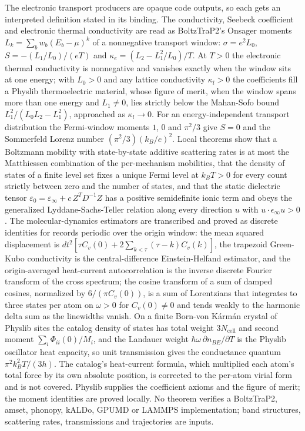\documentclass[11pt,a4paper]{article}
\begin{document}
The electronic transport producers are opaque code outputs, so each gets an interpreted definition stated in its binding. The conductivity, Seebeck coefficient and electronic thermal conductivity are read as BoltzTraP2's Onsager moments $L_k = \sum_b w_b (E_b - \mu)^k$ of a nonnegative transport window: $\sigma = e^2 L_0$, $S = -(L_1/L_0)/(eT)$ and $\kappa_e = (L_2 - L_1^2/L_0)/T$. At $T > 0$ the electronic thermal conductivity is nonnegative and vanishes exactly when the window sits at one energy; with $L_0 > 0$ and any lattice conductivity $\kappa_l > 0$ the coefficients fill a Physlib thermoelectric material, whose figure of merit, when the window spans more than one energy and $L_1 \neq 0$, lies strictly below the Mahan-Sofo bound $L_1^2/(L_0 L_2 - L_1^2)$, approached as $\kappa_l \to 0$. For an energy-independent transport distribution the Fermi-window moments $1$, $0$ and $\pi^2/3$ give $S = 0$ and the Sommerfeld Lorenz number $(\pi^2/3)(k_B/e)^2$. Local theorems show that a Boltzmann mobility with state-by-state additive scattering rates is at most the Matthiessen combination of the per-mechanism mobilities, that the density of states of a finite level set fixes a unique Fermi level at $k_B T > 0$ for every count strictly between zero and the number of states, and that the static dielectric tensor $\varepsilon_0 = \varepsilon_\infty + c\, Z^T D^{-1} Z$ has a positive semidefinite ionic term and obeys the generalized Lyddane-Sachs-Teller relation along every direction $u$ with $u \cdot \epsilon_\infty u > 0$. The molecular-dynamics estimators are transcribed and proved as discrete identities for records periodic over the origin window: the mean squared displacement is $dt^2 [\tau C_v(0) + 2\sum_{k<\tau} (\tau - k) C_v(k)]$, the trapezoid Green-Kubo conductivity is the central-difference Einstein-Helfand estimator, and the origin-averaged heat-current autocorrelation is the inverse discrete Fourier transform of the cross spectrum; the cosine transform of a sum of damped cosines, normalized by $6/(\pi C_v(0))$, is a sum of Lorentzians that integrates to three states per atom on $\omega > 0$ for $C_v(0) \neq 0$ and tends weakly to the harmonic delta sum as the linewidths vanish. On a finite Born-von K\'arm\'an crystal of Physlib sites the catalog density of states has total weight $3N_{\mathrm{cell}}$ and second moment $\sum_i \Phi_{ii}(0)/M_i$, and the Landauer weight $\hbar\omega\,\partial n_{BE}/\partial T$ is the Physlib oscillator heat capacity, so unit transmission gives the conductance quantum $\pi^2 k_B^2 T/(3h)$. The catalog's heat-current formula, which multiplied each atom's total force by its own absolute position, is corrected to the per-atom virial form and is not covered. Physlib supplies the coefficient axioms and the figure of merit; the moment identities are proved locally. No theorem verifies a BoltzTraP2, amset, phonopy, kALDo, GPUMD or LAMMPS implementation; band structures, scattering rates, transmissions and trajectories are inputs.
\end{document}
